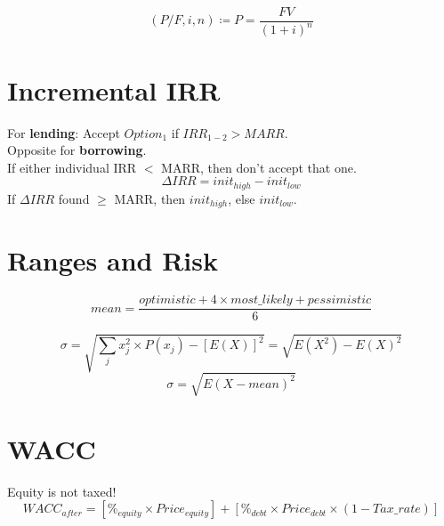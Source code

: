 \documentclass[10pt]{article}
\begin{document}
\begin{multicols*}{2}
\begin{equation*}
  (P/F, i, n) \coloneqq P = \frac{FV}{{(1+i)}^n}
\end{equation*}

\section{Incremental IRR}
  For \textbf{lending}: Accept $Option_1$ if $IRR_{1-2} > MARR$.\\
  Opposite for \textbf{borrowing}.\\
  If either individual IRR $<$ MARR, then don't accept that one.
\begin{equation*}
  \Delta IRR = init_{high} - init_{low}
\end{equation*}
  If $\Delta IRR$ found $\geq$ MARR, then $init_{high}$, else $init_{low}$.

  \section{Ranges and Risk}
\begin{equation*}
  mean = \frac{optimistic + 4\times most\_likely + pessimistic}{6}
\end{equation*}

\begin{equation*}
  \sigma = \sqrt{\sum_j x_j^2 \times P(x_j) - {\left[ E(X) \right]}^2} = \sqrt{E(X^2) - {E(X)}^2}
\end{equation*}
\begin{equation*}
  \sigma = \sqrt{{E(X-mean)}^2}
\end{equation*}

\section{WACC}
Equity is not taxed!
\begin{equation*}
  WACC_{after} = \left[\%_{equity} \times Price_{equity}\right] + \left[\%_{debt} \times Price_{debt} \times (1 - Tax\_rate) \right]
\end{equation*}

\end{multicols*}
\end{document}
